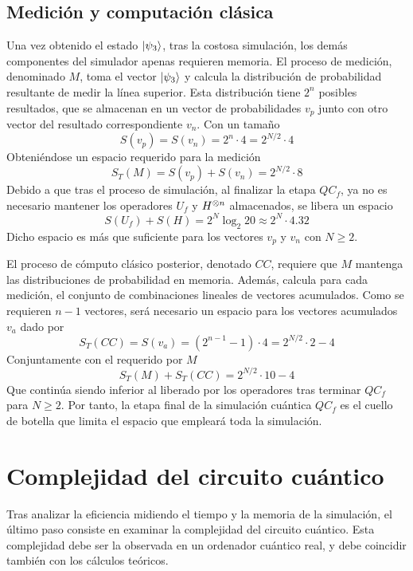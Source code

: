 \subsection{Medición y computación clásica}
Una vez obtenido el estado $\ket{\psi_{3}}$, tras la costosa simulación, los demás 
componentes del simulador apenas requieren memoria.
El proceso de medición, denominado $M$, toma el vector $\ket{\psi_{3}}$ y calcula la 
distribución de probabilidad resultante de medir la línea superior. Esta 
distribución tiene $2^n$ posibles resultados, que se almacenan en un vector de 
probabilidades $v_p$ junto con otro vector del resultado correspondiente $v_n$.  
Con un tamaño
$$ S(v_p) = S(v_n) = 2^{n} \cdot 4 = 2^{N/2} \cdot 4 $$
Obteniéndose un espacio requerido para la medición
$$ S_T(M) = S(v_p) + S(v_n) = 2^{N/2} \cdot 8 $$
Debido a que tras el proceso de simulación, al finalizar la etapa $QC_f$, ya no 
es necesario mantener los operadores $U_f$ y ${H}^{\otimes n}$ almacenados, se libera 
un espacio
$$ S(U_f) + S(H) = 2^N \log_2 20 \approx 2^N \cdot 4.32$$
Dicho espacio es más que suficiente para los vectores $v_p$ y $v_n$ con $N \geq 
2$.

El proceso de cómputo clásico posterior, denotado $CC$, requiere que $M$ 
mantenga las distribuciones de probabilidad en memoria. Además, calcula para 
cada medición, el conjunto de combinaciones lineales de vectores acumulados.  
Como se requieren $n-1$ vectores, será necesario un espacio para los vectores 
acumulados $v_a$ dado por
$$ S_T(CC) = S(v_a) = (2^{n-1} - 1) \cdot 4 = 2^{N/2} \cdot 2 - 4$$
Conjuntamente con el requerido por $M$
$$ S_T(M) + S_T(CC) = 2^{N/2} \cdot 10 - 4 $$
Que continúa siendo inferior al liberado por los operadores tras terminar $QC_f$ 
para $N \geq 2$. Por tanto, la etapa final de la simulación cuántica $QC_f$ es 
el cuello de botella que limita el espacio que empleará toda la simulación.


\section{Complejidad del circuito cuántico}
Tras analizar la eficiencia midiendo el tiempo y la memoria de la simulación, el 
último paso consiste en examinar la complejidad del circuito cuántico. Esta 
complejidad debe ser la observada en un ordenador cuántico real, y debe 
coincidir también con los cálculos teóricos.

